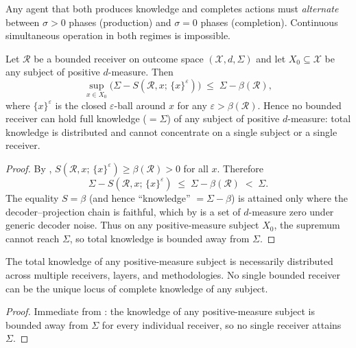 \begin{corollary}
\label{cor:alternation-ch02}
Any agent that both produces knowledge and completes actions must
\emph{alternate} between $\sigma > 0$ phases (production) and $\sigma = 0$
phases (completion).  Continuous simultaneous operation in both regimes is
impossible.
\end{corollary}

\begin{theorem}
\label{thm:distribution-ch02}
Let $\mathcal{R}$ be a bounded receiver on outcome space
$(\mathcal{X}, d, \Sigma)$ and let $X_0 \subseteq \mathcal{X}$ be any
subject of positive $d$-measure.  Then
\[
  \sup_{x \in X_0} \bigl(\Sigma - S(\mathcal{R}, x;\, \{x\}^\varepsilon)\bigr)
  \;\leq\; \Sigma - \beta(\mathcal{R}) ,
\]
where $\{x\}^\varepsilon$ is the closed $\varepsilon$-ball around $x$ for any
$\varepsilon > \beta(\mathcal{R})$.  Hence no bounded receiver can hold full
knowledge ($= \Sigma$) of any subject of positive $d$-measure: total knowledge
is distributed and cannot concentrate on a single subject or a single receiver.
\end{theorem}

\begin{proof}
By , $S(\mathcal{R}, x;\, \{x\}^\varepsilon)
\geq \beta(\mathcal{R}) > 0$ for all $x$.  Therefore
\[
  \Sigma - S(\mathcal{R}, x;\, \{x\}^\varepsilon)
  \;\leq\; \Sigma - \beta(\mathcal{R}) \;<\; \Sigma .
\]
The equality $S = \beta$ (and hence ``knowledge'' $= \Sigma - \beta$) is
attained only where the decoder--projection chain is faithful, which by
 is a set of $d$-measure zero under generic decoder
noise.  Thus on any positive-measure subject $X_0$, the supremum cannot reach
$\Sigma$, so total knowledge is bounded away from $\Sigma$.
\end{proof}

\begin{corollary}
\label{cor:anti-monopoly}
The total knowledge of any positive-measure subject is necessarily distributed
across multiple receivers, layers, and methodologies.  No single bounded
receiver can be the unique locus of complete knowledge of any subject.
\end{corollary}

\begin{proof}
Immediate from : the knowledge of any positive-measure
subject is bounded away from $\Sigma$ for every individual receiver, so no
single receiver attains $\Sigma$.
\end{proof}

